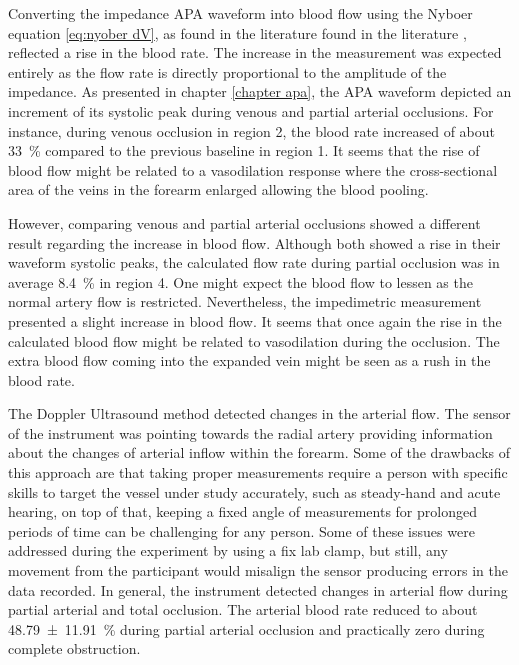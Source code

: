 Converting the impedance APA waveform into blood flow using the Nyboer equation \ref{eq:nyober dV}, as found in the literature found in the literature \cite{corciova2011peripheral, porter1985measurement, brown1975impedance, marks1985computer}, reflected a rise in the blood rate. The increase in the measurement was expected entirely as the flow rate is directly proportional to the amplitude of the impedance. As presented in chapter \ref{chapter apa}, the APA waveform depicted an increment of its systolic peak during venous and partial arterial occlusions. For instance, during venous occlusion in region 2, the blood rate increased of about \SI{33}{\percent} compared to the previous baseline in region 1. It seems that the rise of blood flow might be related to a vasodilation response where the cross-sectional area of the veins in the forearm enlarged allowing the blood pooling. 

However, comparing venous and partial arterial occlusions showed a different result regarding the increase in blood flow. Although both showed a rise in their waveform systolic peaks, the calculated flow rate during partial occlusion was in average \SI{8.4}{\percent} in region 4. One might expect the blood flow to lessen as the normal artery flow is restricted. Nevertheless, the impedimetric measurement presented a slight increase in blood flow. It seems that once again the rise in the calculated blood flow might be related to vasodilation during the occlusion. The extra blood flow coming into the expanded vein might be seen as a rush in the blood rate.

The Doppler Ultrasound method detected changes in the arterial flow. The sensor of the instrument was pointing towards the radial artery providing information about the changes of arterial inflow within the forearm. Some of the drawbacks of this approach are that taking proper measurements require a person with specific skills to target the vessel under study accurately, such as steady-hand and acute hearing, on top of that, keeping a fixed angle of measurements for prolonged periods of time can be challenging for any person. Some of these issues were addressed during the experiment by using a fix lab clamp, but still, any movement from the participant would misalign the sensor producing errors in the data recorded. In general, the instrument detected changes in arterial flow during partial arterial and total occlusion. The arterial blood rate reduced to about \SI{48.79(1191)}{\percent} during partial arterial occlusion and practically zero during complete obstruction.

